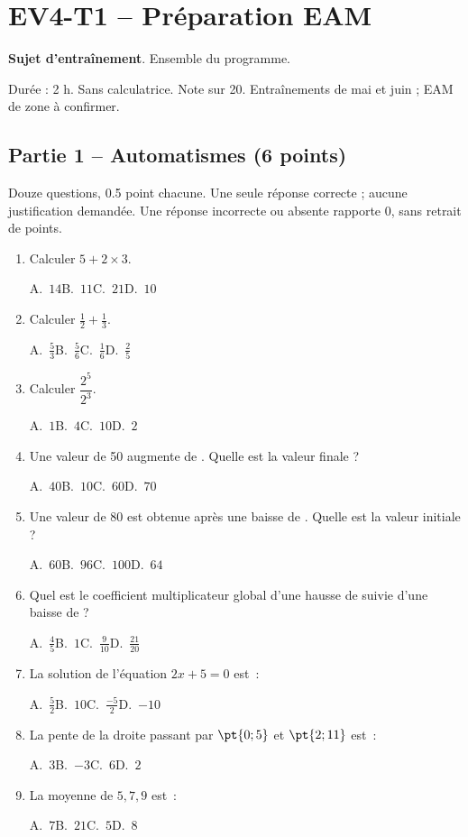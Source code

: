 \mxnewpage\section*{EV4-T1 -- Préparation EAM}\label{EV4-T1}
\textbf{Sujet d’entraînement}. Ensemble du programme.\par Durée : 2 h. Sans calculatrice. Note sur 20. Entraînements de mai et juin ; EAM de zone à confirmer.
\subsection*{Partie 1 -- Automatismes (6 points)}
Douze questions, \num{0,5} point chacune. Une seule réponse correcte ; aucune justification demandée. Une réponse incorrecte ou absente rapporte 0, sans retrait de points.
\begin{enumerate}
\item Calculer $5+2\times3$.\par A.~$14$\quad B.~$11$\quad C.~$21$\quad D.~$10$
\item Calculer $\frac12+\frac13$.\par A.~$\frac{5}{3}$\quad B.~$\frac{5}{6}$\quad C.~$\frac{1}{6}$\quad D.~$\frac{2}{5}$
\item Calculer $\dfrac{2^5}{2^{3}}$.\par A.~$1$\quad B.~$4$\quad C.~$10$\quad D.~$2$
\item Une valeur de 50 augmente de . Quelle est la valeur finale ?\par A.~$40$\quad B.~$10$\quad C.~$60$\quad D.~$70$
\item Une valeur de 80 est obtenue après une baisse de . Quelle est la valeur initiale ?\par A.~$60$\quad B.~$96$\quad C.~$100$\quad D.~$64$
\item Quel est le coefficient multiplicateur global d’une hausse de  suivie d’une baisse de  ?\par A.~$\frac{4}{5}$\quad B.~$1$\quad C.~$\frac{9}{10}$\quad D.~$\frac{21}{20}$
\item La solution de l’équation $2x+5=0$ est~:\par A.~$\frac{5}{2}$\quad B.~$10$\quad C.~$\frac{-5}{2}$\quad D.~$-10$
\item La pente de la droite passant par $\pt{0;5}$ et $\pt{2;11}$ est~:\par A.~$3$\quad B.~$-3$\quad C.~$6$\quad D.~$2$
\item La moyenne de $5, 7, 9$ est~:\par A.~$7$\quad B.~$21$\quad C.~$5$\quad D.~$8$

\end{enumerate}

